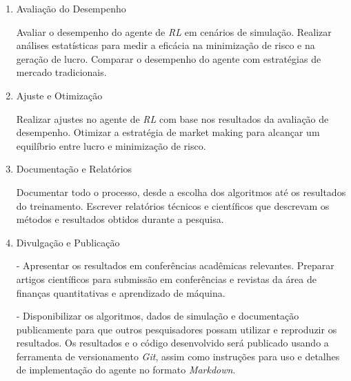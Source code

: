 \begin{enumerate}
\item Avaliação do Desempenho \label{item:evaluation}

Avaliar o desempenho do agente de \textit{RL} em cenários de simulação.
Realizar análises estatísticas para medir a eficácia na minimização de risco e na geração de lucro.
Comparar o desempenho do agente com estratégias de mercado tradicionais.

\item Ajuste e Otimização \label{item:adjustments}

Realizar ajustes no agente de \textit{RL} com base nos resultados da avaliação de desempenho. Otimizar a estratégia de market making para alcançar um equilíbrio entre lucro e minimização de risco.

\item Documentação e Relatórios \label{item:reports}

Documentar todo o processo, desde a escolha dos algoritmos até os resultados do treinamento. Escrever relatórios técnicos e científicos que descrevam os métodos e resultados obtidos durante a pesquisa.

\item Divulgação e Publicação \label{item:publishing}

- Apresentar os resultados em conferências acadêmicas relevantes. Preparar artigos científicos para submissão em conferências e revistas da área de finanças quantitativas e aprendizado de máquina.

- Disponibilizar os algoritmos, dados de simulação e documentação publicamente para que outros pesquisadores possam utilizar e reproduzir os resultados. Os resultados e o código desenvolvido será publicado usando a ferramenta de versionamento \textit{Git}, assim como instruções para uso e detalhes de implementação do agente no formato \textit{Markdown}.
\end{enumerate}
